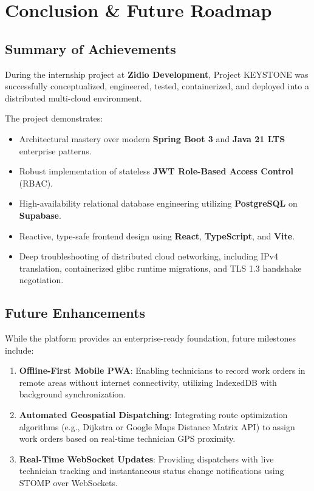 \documentclass[12pt,a4paper,oneside]{report}
\begin{document}
\newpage
\chapter{Conclusion \& Future Roadmap}

\section{Summary of Achievements}
During the internship project at \textbf{Zidio Development}, Project KEYSTONE was successfully conceptualized, engineered, tested, containerized, and deployed into a distributed multi-cloud environment. 

The project demonstrates:
\begin{itemize}
    \item Architectural mastery over modern \textbf{Spring Boot 3} and \textbf{Java 21 LTS} enterprise patterns.
    \item Robust implementation of stateless \textbf{JWT Role-Based Access Control} (RBAC).
    \item High-availability relational database engineering utilizing \textbf{PostgreSQL} on \textbf{Supabase}.
    \item Reactive, type-safe frontend design using \textbf{React}, \textbf{TypeScript}, and \textbf{Vite}.
    \item Deep troubleshooting of distributed cloud networking, including IPv4 translation, containerized glibc runtime migrations, and TLS 1.3 handshake negotiation.
\end{itemize}

\section{Future Enhancements}
While the platform provides an enterprise-ready foundation, future milestones include:
\begin{enumerate}
    \item \textbf{Offline-First Mobile PWA}: Enabling technicians to record work orders in remote areas without internet connectivity, utilizing IndexedDB with background synchronization.
    \item \textbf{Automated Geospatial Dispatching}: Integrating route optimization algorithms (e.g., Dijkstra or Google Maps Distance Matrix API) to assign work orders based on real-time technician GPS proximity.
    \item \textbf{Real-Time WebSocket Updates}: Providing dispatchers with live technician tracking and instantaneous status change notifications using STOMP over WebSockets.
\end{enumerate}
\end{document}

